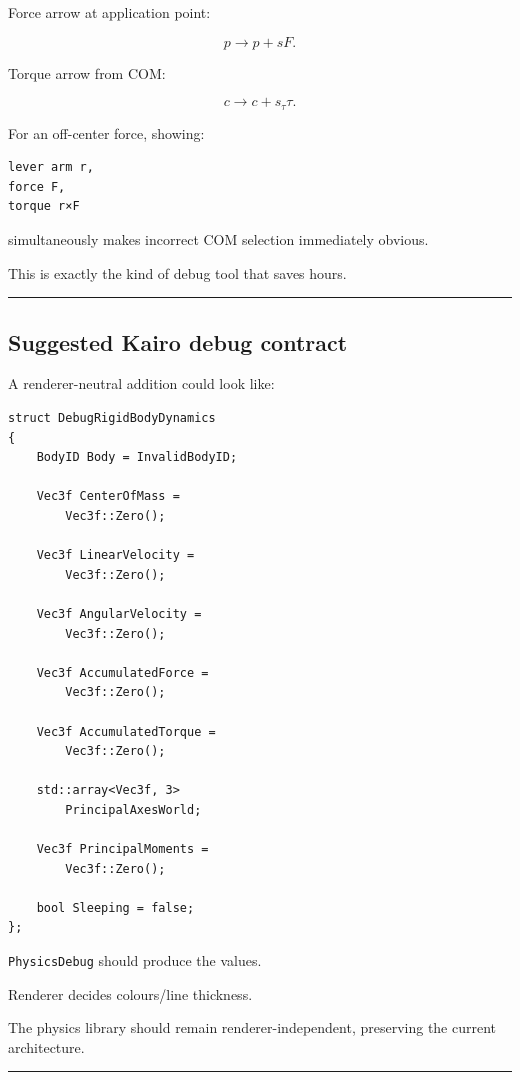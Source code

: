 Force arrow at application point:

\[
p\rightarrow p+sF.
\]

Torque arrow from COM:

\[
c\rightarrow c+s_\tau\tau.
\]

For an off-center force, showing:

\begin{verbatim}
lever arm r,
force F,
torque r×F
\end{verbatim}

simultaneously makes incorrect COM selection immediately obvious.

This is exactly the kind of debug tool that saves hours.

\begin{center}\rule{0.5\linewidth}{0.5pt}\end{center}

\subsection{Suggested Kairo debug contract}\label{06-engine-ii-ch039-suggested-kairo-debug-contract}

A renderer-neutral addition could look like:

\begin{verbatim}
struct DebugRigidBodyDynamics
{
    BodyID Body = InvalidBodyID;

    Vec3f CenterOfMass =
        Vec3f::Zero();

    Vec3f LinearVelocity =
        Vec3f::Zero();

    Vec3f AngularVelocity =
        Vec3f::Zero();

    Vec3f AccumulatedForce =
        Vec3f::Zero();

    Vec3f AccumulatedTorque =
        Vec3f::Zero();

    std::array<Vec3f, 3>
        PrincipalAxesWorld;

    Vec3f PrincipalMoments =
        Vec3f::Zero();

    bool Sleeping = false;
};
\end{verbatim}

\texttt{PhysicsDebug} should produce the values.

Renderer decides colours/line thickness.

The physics library should remain renderer-independent, preserving the current architecture.

\begin{center}\rule{0.5\linewidth}{0.5pt}\end{center}

